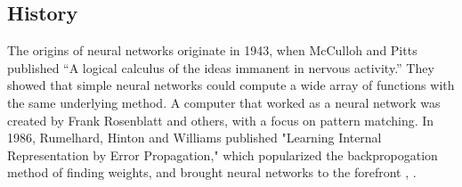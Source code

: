 \documentclass[12pt]{ucthesis}
\begin{document}



\subsection{History}
\label{History}

The origins of neural networks originate in 1943, when McCulloh and Pitts published ``A logical calculus of the ideas immanent in nervous activity.'' They showed that simple neural networks could compute a wide array of functions with the same underlying method. A computer that worked as a neural network was created by Frank Rosenblatt and others, with a focus on pattern matching. In 1986, Rumelhard, Hinton and Williams published "Learning Internal Representation by Error Propagation," which popularized the backpropogation method of finding weights, and brought neural networks to the forefront \cite{BackpropHist}, \cite{yadav_2015}.
\end{document}
